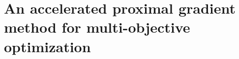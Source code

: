 \documentclass[../main]{subfiles}
\begin{document}
\chapter{An accelerated proximal gradient method for multi-objective optimization} 












\end{document}
